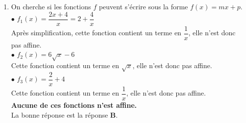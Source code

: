 \documentclass[a4paper,11pt]{article}
\begin{document}
{\begin{seanceD}{}
\begin{enumerate}
\medskip
La bonne réponse est la réponse {\bfseries \color[HTML]{F15929}D}.

\item On cherche si les fonctions $f$ peuvent s'écrire sous la forme $f(x)=mx+p$.\\ $\bullet$ $f_1(x)=\dfrac{2x+4}{x}=2+\dfrac{4}{x}$\\
        Après simplification, cette fonction contient un terme en $\dfrac{1}{x}$, elle n'est donc pas affine.\\
        
         $\bullet$ $f_2(x)=6\sqrt{x}-6$\\
        Cette fonction contient un terme en $\sqrt{x}$, elle n'est donc pas affine.\\        $\bullet$ $f_3(x)=\dfrac{2}{x}+4$\\
        Cette fonction contient un terme en $\dfrac{1}{x}$, elle n'est donc pas affine.\\
{\bfseries \color[HTML]{F15929}Aucune de ces fonctions n'est affine.}\\La bonne réponse est la réponse {\bfseries \color[HTML]{F15929}B}.

\end{enumerate}

\end{seanceD}
}{}
\end{document}
